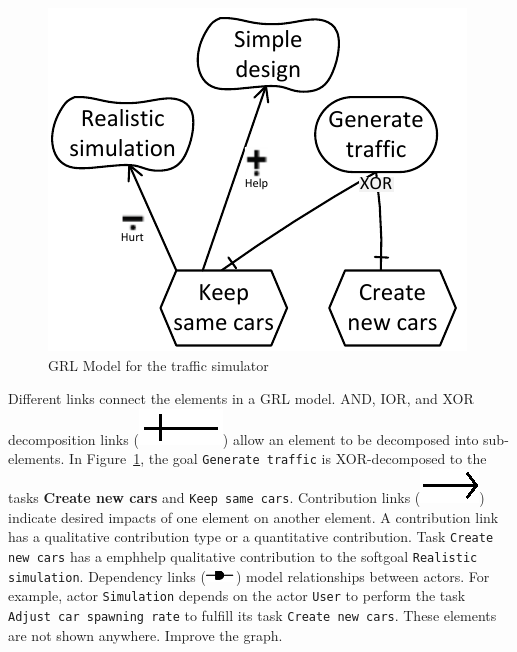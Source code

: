 \begin{figure}[ht]
\centering
\includegraphics[]{img/Example}
\caption{GRL Model for the traffic simulator}
\label{fig:trafficsim}
\end{figure}

Different links connect the elements in a GRL model. AND, IOR, and XOR decomposition links (\includegraphics[scale=1]{img/decomposition}) allow an element to be decomposed into sub-elements. In Figure~\ref{fig:trafficsim}, the goal  \texttt{Generate traffic} is XOR-decomposed to the tasks \textbf{Create new cars} and  \texttt{Keep same cars}. Contribution links (\includegraphics[scale=1]{img/contribution}) indicate desired impacts of one element on another element. A contribution link has a qualitative contribution type or a quantitative contribution. Task  \texttt{Create new cars} has a  emph{help} qualitative contribution to the softgoal  \texttt{Realistic simulation}. Dependency links (\includegraphics[scale=1]{img/dependency}) model relationships between actors. For example, actor  \texttt{Simulation} depends on the actor  \texttt{User} to perform the task  \texttt{Adjust car spawning rate} to fulfill its task  \texttt{Create new cars}.  These elements are not shown anywhere. Improve the graph. 


